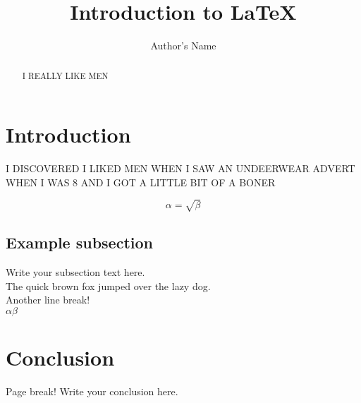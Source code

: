 \documentclass{article}
\begin{document}
\title{Introduction to \LaTeX{}}
\author{Author's Name}
\maketitle

\begin{abstract}
I REALLY LIKE MEN\\
\end{abstract}

\section{Introduction}
I DISCOVERED I LIKED MEN WHEN I SAW AN UNDEERWEAR ADVERT WHEN I WAS 8 AND I GOT A LITTLE BIT OF A BONER

\begin{equation}
	\label{simple_equation}
	\alpha = \sqrt{ \beta }
\end{equation}

\subsection{Example subsection}
Write your subsection text here. \\ The quick brown fox jumped over the lazy dog.
\\ Another line break! \\ $\alpha\beta$
\newpage

\section{Conclusion}
Page break!
Write your conclusion here.
\end{document}
